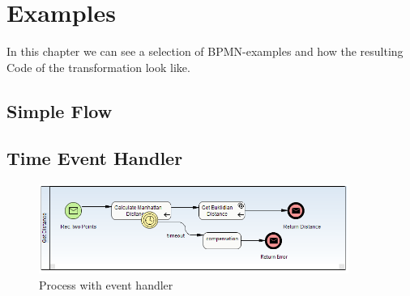 \chapter{Examples}
\label{chap:examples}

In this chapter we can see a selection of BPMN-examples and how the resulting Code of the transformation look like.
\section{Simple Flow}

\section{Time Event Handler}
\begin{figure}[h]
	\centering
		\includegraphics[width=0.90\textwidth]{images/TimeEventHandlerExample.png}
	\caption{Process with event handler}
	\label{fig:event_handler}
\end{figure}


